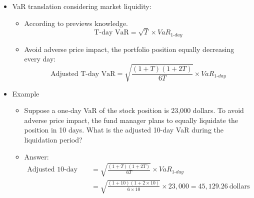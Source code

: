 \begin{itemize}
\begin{itemize}
    \end{itemize}
\item VaR translation considering market liquidity:
    \begin{itemize}
    \item According to previews knowledge.
    \[
\text{T-day VaR} = \sqrt{T} \times VaR_{1\text{-}day}
\]
    \item Avoid adverse price impact, the portfolio position equally decreasing every day:
    \[
\text{Adjusted T-day VaR} = \sqrt{\frac{(1+T)(1+2T)}{6T}} \times VaR_{1\text{-}day}
\]
    \end{itemize}
\item Example
    \begin{itemize}
    \item Suppose a one-day VaR of the stock position is 23,000 dollars. To avoid adverse price impact, the fund manager plans to equally liquidate the position in 10 days. What is the adjusted 10-day VaR during the liquidation period?
    \item Answer:
    \begin{align*}
        \text{Adjusted 10-day VaR} 
        &= \sqrt{\frac{(1+T)(1+2T)}{6T}} \times VaR_{1\text{-}day} \\
        &= \sqrt{\frac{(1+10)(1+2\times10)}{6\times10}} \times 23{,}000 = 45{,}129.26\ \text{dollars}
        \end{align*}
    \end{itemize}

\end{itemize}



